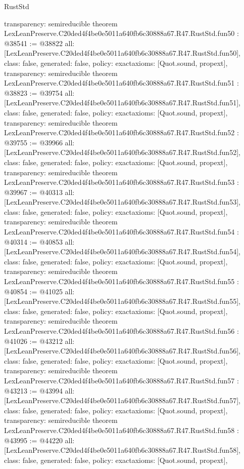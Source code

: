 \begin{lexlean}{RustStd}
\begin{coremodule}
{  transparency: semireducible
}
theorem LexLeanPreserve.C20ded4f4be0e5011a640fb6c30888a67.R47.RustStd.fun50 : @38541 := @38822 {
  all: [LexLeanPreserve.C20ded4f4be0e5011a640fb6c30888a67.R47.RustStd.fun50],
  class: false,
  generated: false,
  policy: exact{axioms: [Quot.sound, propext]},
  transparency: semireducible
}
theorem LexLeanPreserve.C20ded4f4be0e5011a640fb6c30888a67.R47.RustStd.fun51 : @38823 := @39754 {
  all: [LexLeanPreserve.C20ded4f4be0e5011a640fb6c30888a67.R47.RustStd.fun51],
  class: false,
  generated: false,
  policy: exact{axioms: [Quot.sound, propext]},
  transparency: semireducible
}
theorem LexLeanPreserve.C20ded4f4be0e5011a640fb6c30888a67.R47.RustStd.fun52 : @39755 := @39966 {
  all: [LexLeanPreserve.C20ded4f4be0e5011a640fb6c30888a67.R47.RustStd.fun52],
  class: false,
  generated: false,
  policy: exact{axioms: [Quot.sound, propext]},
  transparency: semireducible
}
theorem LexLeanPreserve.C20ded4f4be0e5011a640fb6c30888a67.R47.RustStd.fun53 : @39967 := @40313 {
  all: [LexLeanPreserve.C20ded4f4be0e5011a640fb6c30888a67.R47.RustStd.fun53],
  class: false,
  generated: false,
  policy: exact{axioms: [Quot.sound, propext]},
  transparency: semireducible
}
theorem LexLeanPreserve.C20ded4f4be0e5011a640fb6c30888a67.R47.RustStd.fun54 : @40314 := @40853 {
  all: [LexLeanPreserve.C20ded4f4be0e5011a640fb6c30888a67.R47.RustStd.fun54],
  class: false,
  generated: false,
  policy: exact{axioms: [Quot.sound, propext]},
  transparency: semireducible
}
theorem LexLeanPreserve.C20ded4f4be0e5011a640fb6c30888a67.R47.RustStd.fun55 : @40854 := @41025 {
  all: [LexLeanPreserve.C20ded4f4be0e5011a640fb6c30888a67.R47.RustStd.fun55],
  class: false,
  generated: false,
  policy: exact{axioms: [Quot.sound, propext]},
  transparency: semireducible
}
theorem LexLeanPreserve.C20ded4f4be0e5011a640fb6c30888a67.R47.RustStd.fun56 : @41026 := @43212 {
  all: [LexLeanPreserve.C20ded4f4be0e5011a640fb6c30888a67.R47.RustStd.fun56],
  class: false,
  generated: false,
  policy: exact{axioms: [Quot.sound, propext]},
  transparency: semireducible
}
theorem LexLeanPreserve.C20ded4f4be0e5011a640fb6c30888a67.R47.RustStd.fun57 : @43213 := @43994 {
  all: [LexLeanPreserve.C20ded4f4be0e5011a640fb6c30888a67.R47.RustStd.fun57],
  class: false,
  generated: false,
  policy: exact{axioms: [Quot.sound, propext]},
  transparency: semireducible
}
theorem LexLeanPreserve.C20ded4f4be0e5011a640fb6c30888a67.R47.RustStd.fun58 : @43995 := @44220 {
  all: [LexLeanPreserve.C20ded4f4be0e5011a640fb6c30888a67.R47.RustStd.fun58],
  class: false,
  generated: false,
  policy: exact{axioms: [Quot.sound, propext]},
}
\end{coremodule}
\end{lexlean}
